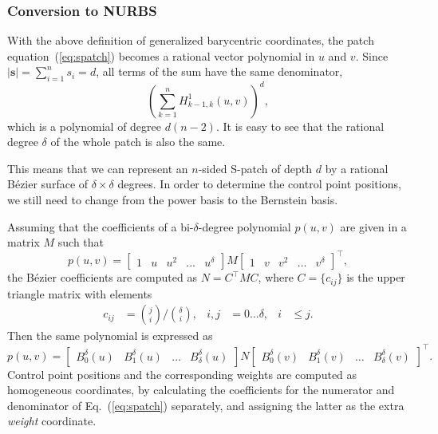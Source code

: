 \documentclass[9pt,academicons]{article}
\begin{document}
\subsubsection{Conversion to NURBS}
\label{subsubsec:conversion}
With the above definition of generalized barycentric coordinates,
the patch equation~(\ref{eq:spatch}) becomes a rational vector polynomial in $u$ and $v$.
Since $|\mathbf{s}|=\sum_{i=1}^ns_i=d$, all terms of the sum have the same denominator,
\begin{equation}
  \left(\sum_{k=1}^nH_{k-1,k}^1(u,v)\right)^d,
\end{equation}
which is a polynomial of degree $d(n-2)$. It is easy to see that the rational degree $\delta$ of
the whole patch is also the same.

This means that we can represent an $n$-sided S-patch of depth $d$ by a rational B\'ezier
surface of $\delta\times\delta$ degrees. In order to determine the control point positions,
we still need to change from the power basis to the Bernstein basis.

Assuming that the coefficients of a bi-$\delta$-degree polynomial $p(u,v)$
are given in a matrix $M$ such that
\begin{equation}
  p(u,v)=
  \left[\begin{array}{ccccc}1&u&u^2&\dots&u^\delta\end{array}\right]
  M
  \left[\begin{array}{ccccc}1&v&v^2&\dots&v^\delta\end{array}\right]^\top,
\end{equation}
the B\'ezier coefficients are computed as $N=C^\top MC$, where $C=\{c_{ij}\}$ is
the upper triangle matrix with elements
\begin{equation}
  \begin{aligned}
    c_{ij}&={j\choose i}\bigg/{\delta\choose i}, & i,j&=0\dots\delta, & i&\leq j.
  \end{aligned}
\end{equation}
Then the same polynomial is expressed as
\begin{equation}
  p(u,v)=
  \left[\begin{array}{cccc}B_0^\delta(u)&B_1^\delta(u)&\dots&B_\delta^\delta(u)\end{array}\right]
  N
  \left[\begin{array}{cccc}B_0^\delta(v)&B_1^\delta(v)&\dots&B_\delta^\delta(v)\end{array}\right]^\top.
\end{equation}
Control point positions and the corresponding weights are computed as homogeneous coordinates,
by calculating the coefficients for the numerator and denominator of Eq.~(\ref{eq:spatch})
separately, and assigning the latter as the extra \emph{weight} coordinate.
\end{document}
